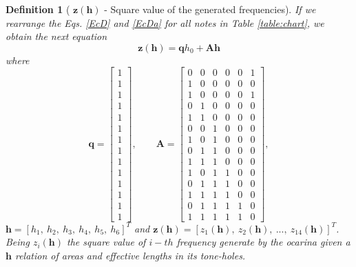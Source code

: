 \documentclass[11pt,twocolumn]{article}
\newtheorem{mydef}{Definition}[section]
\begin{document}
\begin{mydef}[
$\mathbf{z}(\mathbf{h})$ - Square value of the generated frequencies]
If we rearrange the Eqs. \ref{EcD} and \ref{EcDa} for all notes in Table \ref{table:chart},
we obtain the next equation
\begin{equation}
\label{eq:genfec}
\mathbf{z}(\mathbf{h}) =  \mathbf{q}h_0 +  \mathbf{A} \mathbf{h}
\end{equation}
where 
\begin{equation}
\mathbf{q}
=  
\begin{bmatrix}
1 \\ 
1 \\ 
1 \\ 
1 \\ 
1 \\ 
1 \\ 
1 \\
1 \\ 
1 \\ 
1 \\ 
1 \\ 
1 \\ 
1 \\ 
1
\end{bmatrix}
, \qquad \mathbf{A}=
\begin{bmatrix}
0 & 0 & 0 & 0 & 0 & 1 \\
1 & 0 & 0 & 0 & 0 & 0 \\
1 & 0 & 0 & 0 & 0 & 1 \\
0 & 1 & 0 & 0 & 0 & 0 \\ 
1 & 1 & 0 & 0 & 0 & 0 \\ 
0 & 0 & 1 & 0 & 0 & 0 \\
1 & 0 & 1 & 0 & 0 & 0 \\ 
0 & 1 & 1 & 0 & 0 & 0 \\ 
1 & 1 & 1 & 0 & 0 & 0 \\ 
1 & 0 & 1 & 1 & 0 & 0 \\ 
0 & 1 & 1 & 1 & 0 & 0 \\ 
1 & 1 & 1 & 1 & 0 & 0 \\
0 & 1 & 1 & 1 & 1 & 0 \\
1 & 1 & 1 & 1 & 1 & 0 
\end{bmatrix}, 
\end{equation}
$\mathbf{h}=[h_{1},~h_{2},~h_{3},~h_{4},~h_{5},~h_{6}]^T$ and 
$\mathbf{z}(\mathbf{h})=[z_{1}(\mathbf{h}),~z_{2}(\mathbf{h}),~...,~z_{14}(\mathbf{h})]^T$.
Being $z_{i}(\mathbf{h})$ the square value of $i-th$ frequency generate by the ocarina given a $\mathbf{h}$ 
relation of areas and effective lengths in its tone-holes.
\end{mydef}
\end{document}

